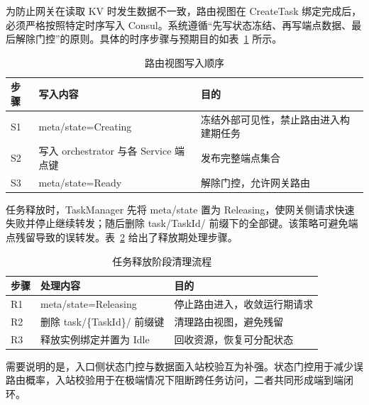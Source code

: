 \documentclass[lang=chs, degree=master, blindreview=true, winfonts=true, academic=false]{yanputhesis}
\begin{document}
为防止网关在读取 KV 时发生数据不一致，路由视图在 CreateTask 绑定完成后，必须严格按照特定时序写入 Consul。系统遵循“先写状态冻结、再写端点数据、最后解除门控”的原则。具体的时序步骤与预期目的如表~\ref{tab:4_write_order} 所示。
\begin{table}[!h]
    \centering
    \caption{路由视图写入顺序}
    \label{tab:4_write_order}
    \begin{tabularx}{\textwidth}{>{\centering\arraybackslash}p{}
                                  >{\centering\arraybackslash}p{}
                                  >{\centering\arraybackslash}X}
        \toprule
        步骤 & 写入内容 & 目的 \\ \midrule
        S1 & meta/state=Creating & 冻结外部可见性，禁止路由进入构建期任务 \\
        S2 & 写入 orchestrator 与各 Service 端点键 & 发布完整端点集合 \\
        S3 & meta/state=Ready & 解除门控，允许网关路由 \\
        \bottomrule
    \end{tabularx}
\end{table}

任务释放时，TaskManager 先将 meta/state 置为 Releasing，使网关侧请求快速失败并停止继续转发；随后删除 task/{TaskId}/ 前缀下的全部键。该策略可避免端点残留导致的误转发。表~\ref{tab:4_cleanup_steps} 给出了释放期处理步骤。
\begin{table}[!h]
    \centering
    \caption{任务释放阶段清理流程}
    \label{tab:4_cleanup_steps}
    \begin{tabularx}{\textwidth}{>{\centering\arraybackslash}p{}
                                  >{\centering\arraybackslash}p{}
                                  >{\centering\arraybackslash}X}
        \toprule
        步骤 & 处理内容 & 目的 \\ \midrule
        R1 & meta/state=Releasing & 停止路由进入，收敛运行期请求 \\
        R2 & 删除 task/\{TaskId\}/ 前缀键 & 清理路由视图，避免残留 \\
        R3 & 释放实例绑定并置为 Idle & 回收资源，恢复可分配状态 \\
        \bottomrule
    \end{tabularx}
\end{table}
需要说明的是，入口侧状态门控与数据面入站校验互为补强。状态门控用于减少误路由概率，入站校验用于在极端情况下阻断跨任务访问，二者共同形成端到端闭环。


\end{document}
